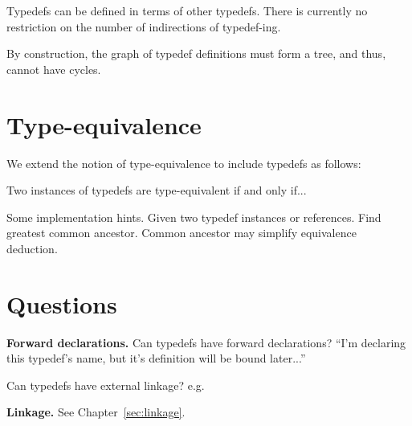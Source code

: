 Typedefs can be defined in terms of other typedefs.  
There is currently no restriction on the number of indirections
of typedef-ing.  

By construction, the graph of typedef definitions must form a tree,
and thus, cannot have cycles.  

\section{Type-equivalence}
\label{sec:typedefs:equivalence}

We extend the notion of type-equivalence to include typedefs as follows:

Two instances of typedefs are type-equivalent if and only if...

Some implementation hints.
Given two typedef instances or references.  
Find greatest common ancestor.  
Common ancestor may simplify equivalence deduction.  

\section{Questions}
\label{sec:typedefs:questions}

\textbf{Forward declarations.}
Can typedefs have forward declarations?
``I'm declaring this typedef's name, but it's definition will be bound
later...''

Can typedefs have external linkage?
e.g. 



\medskip
\textbf{Linkage.}  See Chapter~\ref{sec:linkage}.  


